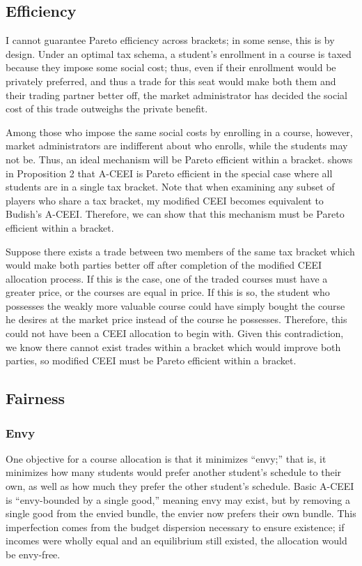 \documentclass{article}
\begin{document}
\subsection{Efficiency}

I cannot guarantee Pareto efficiency across brackets; in some sense, this is by design. Under an optimal tax schema, a student's enrollment in a course is taxed because they impose some social cost; thus, even if their enrollment would be privately preferred, and thus a trade for this seat would make both them and their trading partner better off, the market administrator has decided the social cost of this trade outweighs the private benefit. 

Among those who impose the same social costs by enrolling in a course, however, market administrators are indifferent about who enrolls, while the students may not be. Thus, an ideal mechanism will be Pareto efficient within a bracket. \textcite{budish2011} shows in Proposition 2 that A-CEEI is Pareto efficient in the special case where all students are in a single tax bracket. Note that when examining any subset of players who share a tax bracket, my modified CEEI becomes equivalent to Budish's A-CEEI. Therefore, we can show that this mechanism must be Pareto efficient within a bracket.

Suppose there exists a trade between two members of the same tax bracket which would make both parties better off after completion of the modified CEEI allocation process. If this is the case, one of the traded courses must have a greater price, or the courses are equal in price. If this is so, the student who possesses the weakly more valuable course could have simply bought the course he desires at the market price instead of the course he possesses. Therefore, this could not have been a CEEI allocation to begin with. Given this contradiction, we know there cannot exist trades within a bracket which would improve both parties, so modified CEEI must be Pareto efficient within a bracket.

\subsection{Fairness}

\subsubsection{Envy}

One objective for a course allocation is that it minimizes ``envy;'' that is, it minimizes how many students would prefer another student's schedule to their own, as well as how much they prefer the other student's schedule. Basic A-CEEI is ``envy-bounded by a single good,'' meaning envy may exist, but by removing a single good from the envied bundle, the envier now prefers their own bundle. This imperfection comes from the budget dispersion necessary to ensure existence; if incomes were wholly equal and an equilibrium still existed, the allocation would be envy-free. 
\end{document}
